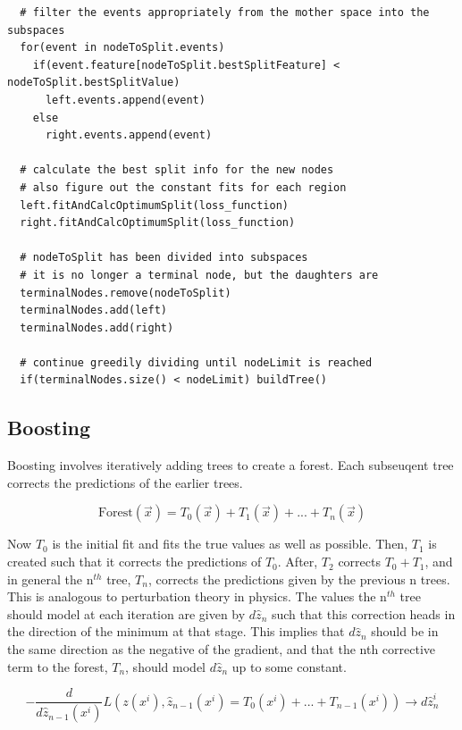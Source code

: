 \documentclass[12pt]{article}
\begin{document}
\begin{verbatim}
  # filter the events appropriately from the mother space into the subspaces
  for(event in nodeToSplit.events)
    if(event.feature[nodeToSplit.bestSplitFeature] < nodeToSplit.bestSplitValue)
      left.events.append(event)
    else 
      right.events.append(event)

  # calculate the best split info for the new nodes
  # also figure out the constant fits for each region
  left.fitAndCalcOptimumSplit(loss_function)
  right.fitAndCalcOptimumSplit(loss_function)

  # nodeToSplit has been divided into subspaces
  # it is no longer a terminal node, but the daughters are
  terminalNodes.remove(nodeToSplit)
  terminalNodes.add(left)
  terminalNodes.add(right)

  # continue greedily dividing until nodeLimit is reached
  if(terminalNodes.size() < nodeLimit) buildTree()

\end{verbatim}

\subsection{Boosting}

Boosting involves iteratively adding trees to create a forest. Each subseuqent tree corrects the predictions of the earlier trees. 

\begin{equation}
\textrm{Forest}(\vec{x}) = T_0(\vec{x}) + T_1(\vec{x}) + ... + T_n(\vec{x})
\end{equation}

Now $T_0$ is the initial fit and fits the true values as well as possible. Then, $T_1$ is created such that it corrects the predictions of $T_0$. After, $T_2$ corrects $T_0 + T_1$, and in general the n$^{th}$ tree, $T_n$, corrects the predictions given by the previous n trees. This is analogous to perturbation theory in physics. The values the n$^{th}$ tree should model at each iteration are given by $d\hat{z}_{n}$ such that this correction heads in the direction of the minimum at that stage. This implies that $d\hat{z}_{n}$ should be in the same direction as the negative of the gradient, and that the nth corrective term to the forest, $T_n$, should model $d\hat{z}_{n}$ up to some constant.

\begin{equation}
-\frac{d}{d\hat{z}_{n-1}(x^i)}L(z(x^i),\hat{z}_{n-1}(x^i) = T_0(x^i)+...+T_{n-1}(x^i)) \rightarrow d\hat{z}^{i}_{n}
\end{equation}
\end{document}
